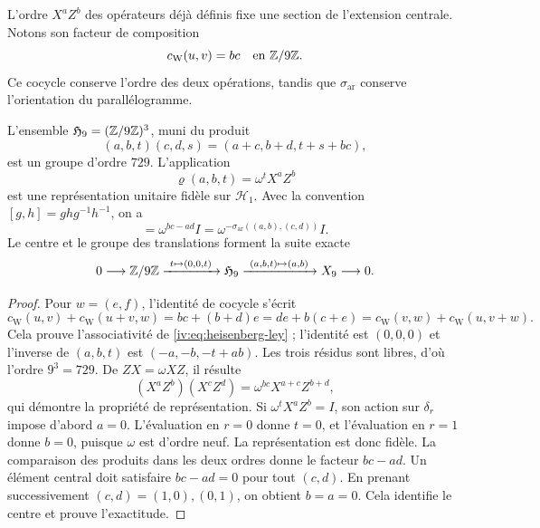L'ordre \(X^aZ^b\) des opérateurs déjà définis fixe une section de l'extension centrale. Notons son facteur de composition
\begin{equation}
 c_{\mathrm W}(u,v)=bc\quad\text{en }\mathbb Z/9\mathbb Z.
 \label{iv:eq:weyl-cociclo-polarizado}
\end{equation}
Ce cocycle conserve l'ordre des deux opérations, tandis que \(\sigma_{\mathrm{ar}}\) conserve l'orientation du parallélogramme.

\begin{proposition}
\label{iv:prop:heisenberg-orientado}
L’ensemble \(\mathfrak H_9=(\mathbb Z/9\mathbb Z)^3\), muni du produit
\begin{equation}
 (a,b,t)(c,d,s)=(a+c,b+d,t+s+bc),
 \label{iv:eq:heisenberg-ley}
\end{equation}
est un groupe d'ordre \(729\). L'application
\[
 \varrho(a,b,t)=\omega^tX^aZ^b
\]
est une représentation unitaire fidèle sur \(\mathcal H_1\).
Avec la convention \([g,h]=ghg^{-1}h^{-1}\), on a
\begin{equation}
 [\varrho(a,b,0),\varrho(c,d,0)]
 =\omega^{bc-ad}I
 =\omega^{-\sigma_{\mathrm{ar}}((a,b),(c,d))}I.
 \label{iv:eq:weyl-conmutador-orientado}
\end{equation}
Le centre et le groupe des translations forment la suite exacte
\[
 0\longrightarrow\mathbb Z/9\mathbb Z
 \xrightarrow{\ t\mapsto(0,0,t)\ }\mathfrak H_9
 \xrightarrow{\ (a,b,t)\mapsto(a,b)\ }X_9
 \longrightarrow0.
\]
\end{proposition}
\begin{proof}
Pour \(w=(e,f)\), l’identité de cocycle s’écrit
\[
 c_{\mathrm W}(u,v)+c_{\mathrm W}(u+v,w)
 =bc+(b+d)e
 =de+b(c+e)
 =c_{\mathrm W}(v,w)+c_{\mathrm W}(u,v+w).
\]
Cela prouve l’associativité de \eqref{iv:eq:heisenberg-ley} ; l’identité
est \((0,0,0)\) et l’inverse de \((a,b,t)\) est
\((-a,-b,-t+ab)\). Les trois résidus sont libres, d’où l’ordre
\(9^3=729\). De \(ZX=\omega XZ\), il résulte
\[
 (X^aZ^b)(X^cZ^d)=\omega^{bc}X^{a+c}Z^{b+d},
\]
qui démontre la propriété de représentation. Si \(\omega^tX^aZ^b=I\), son action sur \(\delta_r\) impose d'abord \(a=0\). L'évaluation en \(r=0\) donne \(t=0\), et l'évaluation en \(r=1\) donne \(b=0\), puisque \(\omega\) est d'ordre neuf. La représentation est donc fidèle. La comparaison des produits dans les deux ordres donne le facteur \(bc-ad\). Un élément central doit satisfaire \(bc-ad=0\) pour tout \((c,d)\). En prenant successivement \((c,d)=(1,0),(0,1)\), on obtient \(b=a=0\). Cela identifie le centre et prouve l'exactitude.
\end{proof}


